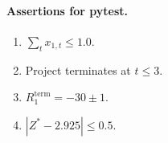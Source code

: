 \paragraph{Assertions for pytest.}
\begin{enumerate}[label=A\arabic*.]
  \item $\sum_t x_{1,t}\leq1.0$.
  \item Project terminates at $t\leq3$.
  \item $R_1^{\mathrm{term}}=-30\pm1$.
  \item $|Z^*-2.925|\leq0.5$.
\end{enumerate}


